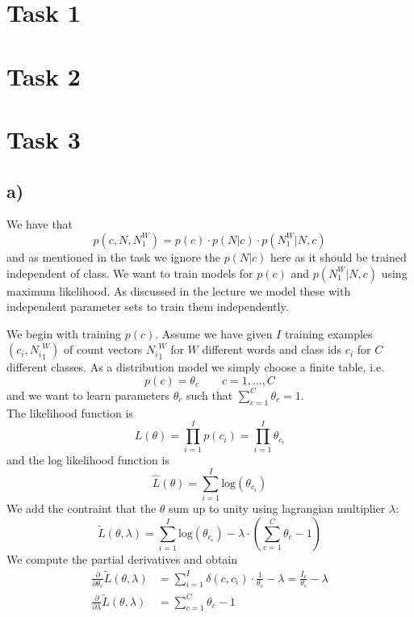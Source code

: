 \documentclass[%
   11pt,              %
   ngerman,           %
   a4paper,           %
   DIV11,             %
]{scrartcl}%
\begin{document}
\section*{Task 1}
\section*{Task 2}
\section*{Task 3}
\subsection*{a)}
We have that 
\begin{equation*}
	p(c, N, N_1^W) = p(c) \cdot p(N|c) \cdot p(N_1^W|N,c)
\end{equation*}
and as mentioned in the task we ignore the $p(N|c)$ here as it should be trained independent of class. We want to train models for $p(c)$ and $p(N_1^W|N,c)$ using maximum likelihood. As discussed in the lecture we model these with independent parameter sets to train them independently. \par
We begin with training $p(c)$. Assume we have given $I$ training examples $(c_i, {N_i}_1^W)$ of count vectors ${N_i}_1^W$ for $W$ different words and class ids $c_i$ for $C$ different classes. As a distribution model we simply choose a finite table, i.e.
\begin{equation}\label{const}
	p(c) = \theta_c \qquad c = 1,\ldots,C
\end{equation} 
and we want to learn parameters $\theta_c$ such that $\sum_{c=1}^C \theta_c = 1$. \\
The likelihood function is 
\begin{equation*}
	L(\theta) = \prod_{i=1}^I p(c_i) = \prod_{i=1}^I \theta_{c_i}
\end{equation*}
and the log likelihood function is
\begin{equation*}
	\hat{L}(\theta) = \sum_{i=1}^I \text{log}(\theta_{c_i})
\end{equation*}
We add the contraint that the $\theta$ sum up to unity using lagrangian multiplier $\lambda$:
\begin{equation*}
	\tilde{L}(\theta, \lambda) = \sum_{i=1}^I \text{log}(\theta_{c_i}) - \lambda \cdot (\sum_{c=1}^C \theta_c - 1)
\end{equation*}
We compute the partial derivatives and obtain
\begin{align*}
	\frac{\partial}{\partial \theta_c} \tilde{L}(\theta, \lambda) &= \sum_{i=1}^I \delta(c,c_i) \cdot \frac{1}{\theta_c} - \lambda = \frac{I_c}{\theta_c} - \lambda \\
	\frac{\partial}{\partial \lambda} \tilde{L}(\theta, \lambda) &= \sum_{c=1}^C \theta_c - 1
\end{align*}
\end{document}
